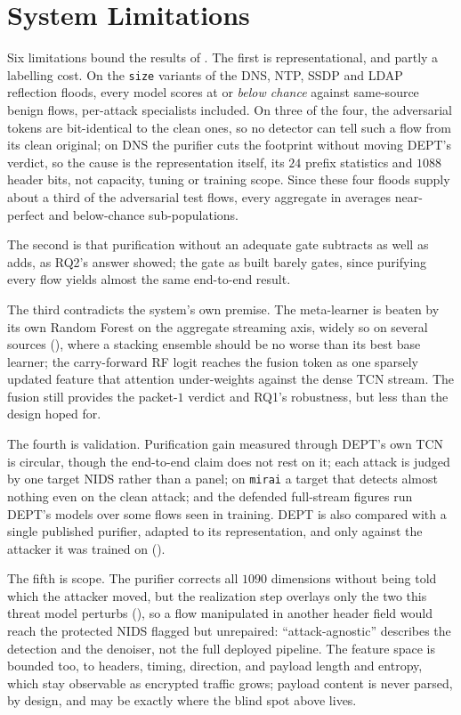 \section{System Limitations}\label{sec:concl-limitations}

Six limitations bound the results of . The first is
representational, and partly a labelling cost. On the \texttt{size} variants of the DNS, NTP, SSDP and LDAP reflection floods,
every model scores at or \emph{below chance} against same-source benign flows, per-attack specialists
included. On three of the four, the adversarial tokens are bit-identical to the clean ones, so no detector
can tell such a flow from its clean original; on DNS the purifier cuts the footprint without moving DEPT's verdict, so the cause is the
representation itself, its $24$ prefix statistics and $1088$ header bits, not capacity, tuning or training
scope. Since these four floods supply about a third of the adversarial test flows, every aggregate in  averages
near-perfect and below-chance sub-populations.

The second is that purification without an adequate gate subtracts as well as adds, as RQ2's
answer showed; the gate as built barely gates, since purifying every flow yields almost the same
end-to-end result.

The third contradicts the system's own premise. The meta-learner is beaten by its own Random
Forest on the aggregate streaming axis, widely so on several sources (), where
a stacking ensemble should be no worse than its best base learner; the carry-forward \ac{RF} logit reaches
the fusion token as one sparsely updated feature that attention under-weights against the dense
\ac{TCN} stream. The fusion
still provides the packet-$1$ verdict and RQ1's robustness, but less than the design hoped for.

The fourth is validation. Purification gain measured through DEPT's own \ac{TCN} is
circular, though the end-to-end claim does not rest on it; each attack is judged by one target
\ac{NIDS} rather than a panel; on \texttt{mirai} a target that detects almost nothing even on the
clean attack; and the defended full-stream figures run DEPT's models over some flows seen in training.
DEPT is also compared with a single published purifier, adapted to its representation, and only
against the attacker it was trained on ().

The fifth is scope. The purifier corrects all $1090$ dimensions without being told which the
attacker moved, but the realization step overlays only the two this threat model perturbs
(), so a flow manipulated in another header field would reach the
protected \ac{NIDS} flagged but unrepaired: ``attack-agnostic'' describes the detection and the
denoiser, not the full deployed pipeline. The feature space is bounded too, to headers, timing,
direction, and payload length and entropy, which stay observable as encrypted traffic grows; payload
content is never parsed, by design, and may be exactly where the blind spot above lives.

